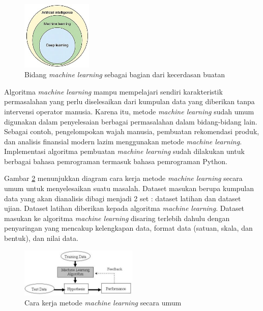 \begin{figure}[H]
\setlength{}
\begin{center}
\includegraphics[width=0.3\textwidth]{fig/aiml.jpg}
	\caption[Bidang \textit{machine learning} sebagai bagian dari kecerdasan buatan]{Bidang \textit{machine learning} sebagai bagian dari kecerdasan buatan~\cite{2020}}
\label{fig:aiml}
\end{center}
\end{figure}

Algoritma \textit{machine learning} mampu mempelajari sendiri karakteristik
permasalahan yang perlu diselesaikan dari kumpulan data yang diberikan tanpa
intervensi operator manusia. Karena itu, metode \textit{machine learning} sudah
umum digunakan dalam penyelesaian berbagai permasalahan dalam bidang-bidang
lain. Sebagai contoh, pengelompokan wajah manusia, pembuatan rekomendasi
produk, dan analisis finansial modern lazim menggunakan metode \textit{machine
learning}. Implementasi algoritma pembuatan \textit{machine learning} sudah
dilakukan untuk berbagai bahasa pemrograman termasuk bahasa pemrograman Python.

Gambar \ref{fig:mldiagram} menunjukkan diagram cara kerja metode
\textit{machine learning} secara umum untuk menyelesaikan suatu masalah.
Dataset masukan berupa kumpulan data yang akan dianalisis dibagi menjadi 2 set
: dataset latihan dan dataset ujian. Dataset latihan diberikan kepada algoritma
\textit{machine learning}. Dataset masukan ke algoritma \textit{machine
learning} disaring terlebih dahulu dengan penyaringan yang mencakup kelengkapan
data, format data (satuan, skala, dan bentuk), dan nilai data.

\begin{figure}[H]
\setlength{}
\begin{center}
\includegraphics[width=0.5\textwidth]{fig/mldiagram.jpg}
	\caption[Cara kerja metode \textit{machine learning} secara umum]{Cara kerja metode \textit{machine learning} secara umum~\cite{2012}}
\label{fig:mldiagram}
\end{center}
\end{figure}

